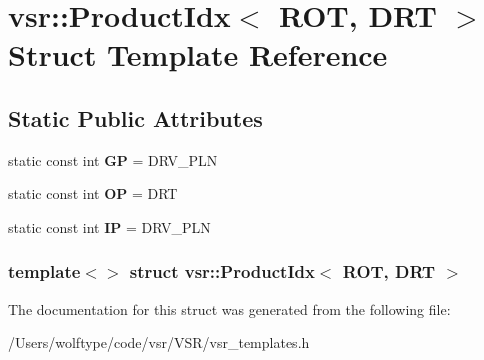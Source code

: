 \hypertarget{structvsr_1_1_product_idx_3_01_r_o_t_00_01_d_r_t_01_4}{\section{vsr\-:\-:Product\-Idx$<$ R\-O\-T, D\-R\-T $>$ Struct Template Reference}
\label{structvsr_1_1_product_idx_3_01_r_o_t_00_01_d_r_t_01_4}
}
\subsection*{Static Public Attributes}
\begin{DoxyCompactItemize}
\item 
\hypertarget{structvsr_1_1_product_idx_3_01_r_o_t_00_01_d_r_t_01_4_a851b8991f2ab07aa2b0487abdffee10b}{static const int {\bfseries G\-P} = D\-R\-V\-\_\-\-P\-L\-N}\label{structvsr_1_1_product_idx_3_01_r_o_t_00_01_d_r_t_01_4_a851b8991f2ab07aa2b0487abdffee10b}

\item 
\hypertarget{structvsr_1_1_product_idx_3_01_r_o_t_00_01_d_r_t_01_4_a399ced857aab0686337cad342bb62b47}{static const int {\bfseries O\-P} = D\-R\-T}\label{structvsr_1_1_product_idx_3_01_r_o_t_00_01_d_r_t_01_4_a399ced857aab0686337cad342bb62b47}

\item 
\hypertarget{structvsr_1_1_product_idx_3_01_r_o_t_00_01_d_r_t_01_4_a7e188a5027dccf98ec46ef380d1dd24e}{static const int {\bfseries I\-P} = D\-R\-V\-\_\-\-P\-L\-N}\label{structvsr_1_1_product_idx_3_01_r_o_t_00_01_d_r_t_01_4_a7e188a5027dccf98ec46ef380d1dd24e}

\end{DoxyCompactItemize}
\subsubsection*{template$<$$>$ struct vsr\-::\-Product\-Idx$<$ R\-O\-T, D\-R\-T $>$}



The documentation for this struct was generated from the following file\-:\begin{DoxyCompactItemize}
\item 
/\-Users/wolftype/code/vsr/\-V\-S\-R/vsr\-\_\-templates.\-h\end{DoxyCompactItemize}

